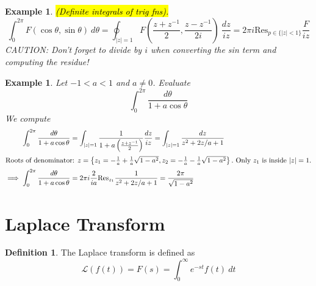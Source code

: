 \documentclass{article}
\newtheorem{example}[theorem]{Example}
\theoremstyle{definition}
\newtheorem{definition}{Definition}[section]
\begin{document}
\begin{example} \normalfont
    \hl{(Definite integrals of trig fns).}
    \begin{equation*}
        \int_0^{2\pi} F(\cos \theta, \sin \theta)\ d\theta = \oint_{|z|=1} F\left( \frac{z+z^{-1}}{2}, \frac{z-z^{-1}}{2i} \right)\ \frac{dz}{iz} = 2 \pi i \text{Res}_{p \in \{ |z| < 1 \}} \frac{F}{iz}
    \end{equation*}
    CAUTION: Don't forget to divide by $i$ when converting the sin term and computing the residue!
\end{example}

\begin{example} \normalfont
    Let $-1 < a < 1$ and $a \neq 0$. Evaluate
    \begin{equation*}
        \int_0^{2\pi} \frac{d\theta}{1 + a \cos \theta}
    \end{equation*}
    We compute
    \begin{align*}
        \int_0^{2\pi} \frac{d\theta}{1 + a \cos \theta} &= \int_{|z|=1} \frac{1}{1+a \left( \frac{z+z^{-1}}{2} \right)} \frac{dz}{iz} = \int_{|z|=1} \frac{dz}{z^2 + 2z/a + 1} \\
        \intertext{Roots of denominator: $z = \left\{ z_1 = -\frac{1}{a} + \frac{1}{a} \sqrt{1-a^2}, z_2 = -\frac{1}{a} - \frac{1}{a} \sqrt{1-a^2} \right\}.$ Only $z_1$ is inside $|z| = 1$.}
        \implies \int_0^{2\pi} \frac{d\theta}{1 + a \cos \theta} &= 2 \pi i \frac{2}{ia} \text{Res}_{z_1} \frac{1}{z^2 + 2z/a + 1} = \frac{2 \pi}{\sqrt{1-a^2}}
    \end{align*}
\end{example}

\section{Laplace Transform}

\begin{definition}
    The Laplace transform is defined as
    \begin{equation*}
        \mathcal{L}(f(t)) = F(s) = \int_0^\infty e^{-st} f(t)\ dt
    \end{equation*}
\end{definition}
\end{document}
